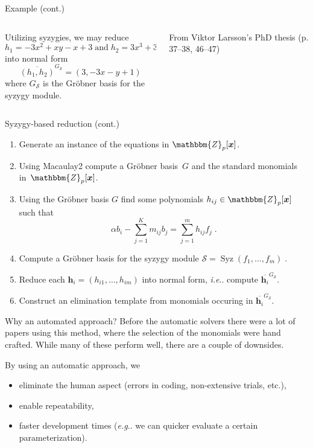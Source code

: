 \documentclass[aspectratio=169]{beamer}
\makeatletter
\newcommand{\mat}[1]{\bm{#1}}
\newcommand{\Z}{\ensuremath{\mathbbm{Z}}}
\DeclareRobustCommand\eg{\emph{e.g}\@ifnextchar.{}{.\@}}
\DeclareRobustCommand\ie{\emph{i.e}\@ifnextchar.{}{.\@}}
\DeclareMathOperator{\syz}{Syz}
\makeatother
\begin{document}
\begin{frame}[t]{Example (cont.)}
\vspace{3mm}
\begin{columns}
    \begin{column}{0.7\textwidth}
        Utilizing syzygies, we may reduce
        \[
            h_1=-3x^2+xy-x+3 \;\text{and}\; h_2 = 3x^3+3xy^2+x-y+1
        \]
        into normal form
        \[
            \overline{(h_1,h_2)}^{G_\mathcal{S}}=(3,-3x-y+1)
        \]
        where $G_\mathcal{S}$ is the Gröbner basis for the syzygy module.
    \end{column}%
    \begin{column}{0.3\textwidth}
        \centering
        

        \vspace{5mm}

        {\scriptsize From Viktor Larsson's PhD thesis (p. 37--38, 46--47)}
    \end{column}
\end{columns}
\end{frame}


\iftrue
\begin{frame}[t]{Syzygy-based reduction (cont.)}
\begin{enumerate}
\item Generate an instance of the equations in $\Z_p[\mat{x}]$.
\item Using Macaulay2 compute a Gröbner basis~$G$ and the standard monomials in~$\Z_p[\mat{x}]$.
\item Using the Gröbner basis $G$ find some polynomials $h_{ij}\in\Z_p[\mat{x}]$ such that
\[
    \alpha b_i- \sum_{j=1}^K m_{ij}b_j = \sum_{j=1}^mh_{ij}f_j\;.
\]
\item Compute a Gröbner basis for the syzygy module
$
    \mathcal{S} = \syz(f_1,\ldots,f_m)\;.
$
\item Reduce each $\mat{h}_i=(h_{i1},\ldots,h_{im})$ into normal form, \ie{} compute $\overline{\mat{h}_i}^{G_{\mathcal{S}}}$.
\item Construct an elimination template from monomials occuring in $\overline{\mat{h}_i}^{G_{\mathcal{S}}}$.
\end{enumerate}
\end{frame}
\fi

\begin{frame}{Why an automated approach?}
Before the automatic solvers there were a lot of papers using this method, where the selection of the monomials were hand crafted. While many of these perform well, there are a couple of downsides.

By using an automatic approach, we
\begin{itemize}
\item eliminate the human aspect (errors in coding, non-extensive trials, etc.),
\item enable repeatability,
\item faster development times (\eg{} we can quicker evaluate a certain parameterization).
\end{itemize}
\end{frame}
\end{document}
